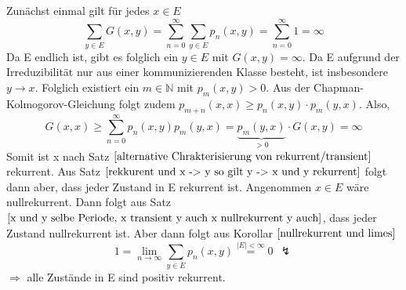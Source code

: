 Zunächst einmal gilt für jedes $x \in E$
\begin{equation*}
\sum_{y \in E}G(x,y) = \sum_{n=0}^{\infty} \sum_{y \in E} p_{n}(x,y) = \sum_{n=0}^{\infty} 1 = \infty
\end{equation*}
Da E endlich ist, gibt es folglich ein $y \in E$ mit $G(x,y) = \infty$. Da E aufgrund der Irreduzibilität nur aus einer kommunizierenden Klasse besteht, ist insbesondere $y \rightarrow x$. Folglich existiert ein $m \in \mathbb{N}$ mit $p_{m}(x,y)>0$. Aus der Chapman-Kolmogorov-Gleichung folgt zudem $p_{m+n}(x,x) \geq p_{n}(x,y) \cdot p_{m}(y,x)$. Also,
\begin{equation*}
G(x,x) \geq \sum_{n=0}^{\infty} p_{n}(x,y)p_{m}(y,x) = \underbrace{p_{m}(y,x)}_{>0} \cdot G(x,y) = \infty
\end{equation*}
Somit ist x nach Satz $\ref{alternative Chrakterisierung von rekurrent/transient}$ rekurrent. Aus Satz $\ref{rekkurent und x -> y so gilt y -> x und y rekurrent}$ folgt dann aber, dass jeder Zustand in E rekurrent ist. Angenommen $x \in E$ wäre nullrekurrent. Dann folgt aus Satz $\ref{x und y selbe Periode, x transient y auch x nullrekurrent y auch}$, dass jeder Zustand nullrekurrent ist. Aber dann folgt aus Korollar $\ref{nullrekurrent und limes}$
\begin{equation*}
1 = \lim_{n \to \infty} \sum_{y \in E} p_{n}(x,y) \stackrel{\vert E \vert < \infty}{=} 0 \: \: \lightning 
\end{equation*}
$\Rightarrow$ alle Zustände in E sind positiv rekurrent.  